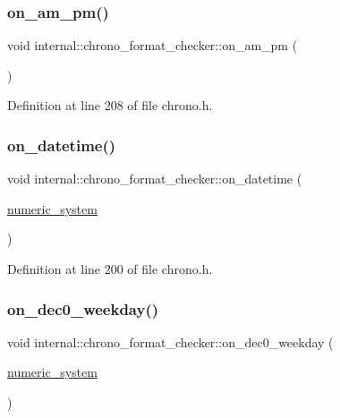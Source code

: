 \subsubsection{\texorpdfstring{on\+\_\+am\+\_\+pm()}{on\_am\_pm()}}
{\footnotesize\ttfamily void internal\+::chrono\+\_\+format\+\_\+checker\+::on\+\_\+am\+\_\+pm (\begin{DoxyParamCaption}{ }\end{DoxyParamCaption})\hspace{0.3cm}{\ttfamily [inline]}}



Definition at line 208 of file chrono.\+h.

\mbox{\label{structinternal_1_1chrono__format__checker_aec3a68aca73bf8b90117e5b65871eb87}} 
\subsubsection{\texorpdfstring{on\+\_\+datetime()}{on\_datetime()}}
{\footnotesize\ttfamily void internal\+::chrono\+\_\+format\+\_\+checker\+::on\+\_\+datetime (\begin{DoxyParamCaption}\item[{\hyperlink{namespaceinternal_a16e2a1195ca0f5beab658685f71df86b}{numeric\+\_\+system}}]{ }\end{DoxyParamCaption})\hspace{0.3cm}{\ttfamily [inline]}}



Definition at line 200 of file chrono.\+h.

\mbox{\label{structinternal_1_1chrono__format__checker_a1c57b6684890c479bbae69b36cdd2d31}} 
\subsubsection{\texorpdfstring{on\+\_\+dec0\+\_\+weekday()}{on\_dec0\_weekday()}}
{\footnotesize\ttfamily void internal\+::chrono\+\_\+format\+\_\+checker\+::on\+\_\+dec0\+\_\+weekday (\begin{DoxyParamCaption}\item[{\hyperlink{namespaceinternal_a16e2a1195ca0f5beab658685f71df86b}{numeric\+\_\+system}}]{ }\end{DoxyParamCaption})\hspace{0.3cm}{\ttfamily [inline]}}



